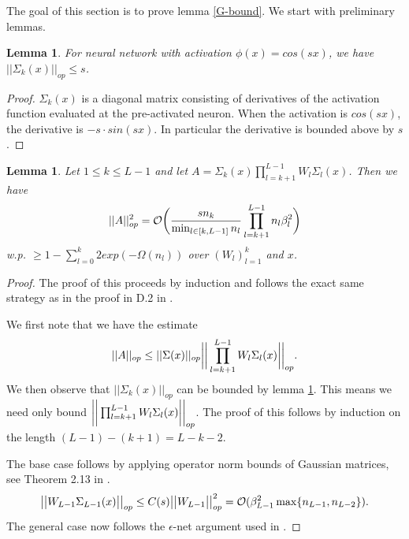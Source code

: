 \documentclass{article}
\theoremstyle{plain}
\newtheorem{lemma}[Theorem]{Lemma}
\theoremstyle{definition}
\theoremstyle{remark}
\begin{document}
The goal of this section is to prove lemma \ref{G-bound}. We start with preliminary lemmas.

\begin{lemma}\label{d2a}
For neural network with activation $\phi(x) = cos(sx)$, we have
$\vert\vert\Sigma_k(x)\vert\vert_{op} \leq s$. 
\end{lemma}

\begin{proof}
$\Sigma_k(x)$ is a diagonal matrix consisting of derivatives of the activation function evaluated at the pre-activated neuron. When the activation is 
$cos(sx)$, the derivative is $-s\cdot sin(sx)$. In particular the derivative is bounded above by $s$. 
\end{proof}

\begin{lemma}\label{d2b}
Let $1 \leq k \leq L-1$ and
let $A = \Sigma_k(x)\prod_{l=k+1}^{L-1}W_l\Sigma_l(x)$. Then we have
\begin{equation*}
\vert\vert A\vert\vert_{op}^2 = \mathcal{O}\bigg{(}
\frac{sn_k}{\min_{l \in [k,L-1]}n_l}\prod_{l=k+1}^{L-1}n_l\beta_l^2
\bigg{)}
\end{equation*}
w.p. $\geq 1 - \sum_{l=0}^k2exp(-\Omega(n_l))$ over $(W_l)_{l=1}^k$ and $x$.
\end{lemma}

\begin{proof}
The proof of this proceeds by induction and follows the exact same strategy 
as in the proof in D.2 in \cite{nguyen2021tight}.

We first note that we have the estimate
\begin{equation}
\vert\vert A\vert\vert_{op} \leq \vert\vert\Sigma(x)\vert\vert_{op}
\bigg{\vert}\bigg{\vert} 
\prod_{l=k+1}^{L-1}W_l\Sigma_l(x)\bigg{\vert}\bigg{\vert}_{op}. 
\end{equation}
We then observe that $\vert\vert \Sigma_k(x)\vert\vert_{op}$ can be bounded
by lemma \ref{d2a}. This means we need only bound 
$\bigg{\vert}\bigg{\vert} 
\prod_{l=k+1}^{L-1}W_l\Sigma_l(x)\bigg{\vert}\bigg{\vert}_{op}$. The proof of this follows by induction on the length $(L-1) - (k+1) = L-k - 2$.

The base case follows by applying operator norm bounds of Gaussian matrices, see Theorem 2.13 in \cite{davidson2001local}.
\begin{equation*}
\big{\vert}\big{\vert} 
W_{L-1}\Sigma_{L-1}(x)\big{\vert}\big{\vert}_{op} \leq 
C(s)\big{\vert}\big{\vert}W_{L-1}\big{\vert}\big{\vert}^2_{op} = 
\mathcal{O}(\beta_{L-1}^2\max\{n_{L-1}, n_{L-2}\}).
\end{equation*}
The general case now follows the $\epsilon$-net argument used in \cite{nguyen2021tight}.
\end{proof}
\end{document}

